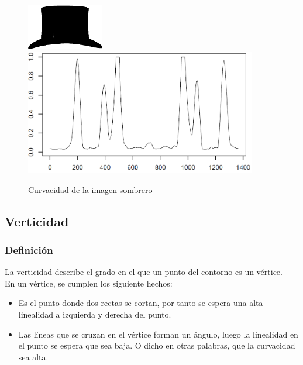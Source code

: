 \begin{figure}[H]
\begin{center}

\includegraphics[width=0.3\textwidth]{img/hat-7.png}
\newline
\includegraphics[width=0.9\textwidth]{img/nolin-hat-7.png}
\end{center}

\caption{Curvacidad de la imagen sombrero}
\end{figure}

\subsection{Verticidad}

\subsubsection{Definición}
La verticidad describe el grado en el que un punto del contorno es un vértice.\\

En un vértice, se cumplen los siguiente hechos:
\begin{itemize}
\item Es el punto donde dos rectas se cortan, por tanto se espera una alta linealidad a izquierda y derecha del punto.
\item Las líneas que se cruzan en el vértice forman un ángulo, luego la linealidad en el punto se espera que sea baja. O dicho en otras palabras, que la curvacidad sea alta.
\end{itemize}

